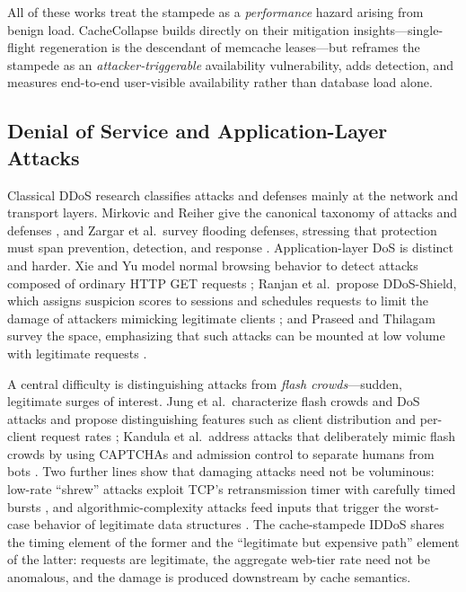 \documentclass[preprint,12pt]{elsarticle}
\begin{document}
All of these works treat the stampede as a \emph{performance} hazard arising from
benign load. CacheCollapse builds directly on their mitigation insights---single-flight
regeneration is the descendant of memcache leases---but reframes the stampede as an
\emph{attacker-triggerable} availability vulnerability, adds detection, and measures
end-to-end user-visible availability rather than database load alone.

\subsection{Denial of Service and Application-Layer Attacks}
Classical DDoS research classifies attacks and defenses mainly at the network and
transport layers. Mirkovic and Reiher give the canonical taxonomy of attacks and
defenses \cite{mirkovic2004}, and Zargar et al.\ survey flooding defenses, stressing
that protection must span prevention, detection, and response \cite{zargar2013}.
Application-layer DoS is distinct and harder. Xie and Yu model normal browsing behavior
to detect attacks composed of ordinary HTTP GET requests \cite{xie2009}; Ranjan et al.\
propose DDoS-Shield, which assigns suspicion scores to sessions and schedules requests
to limit the damage of attackers mimicking legitimate clients \cite{ranjan2009};
and Praseed and Thilagam survey the space, emphasizing that such attacks can be
mounted at low volume with legitimate requests \cite{praseed2019}.

A central difficulty is distinguishing attacks from \emph{flash crowds}---sudden,
legitimate surges of interest. Jung et al.\ characterize flash crowds and DoS attacks
and propose distinguishing features such as client distribution and per-client request
rates \cite{jung2002}; Kandula et al.\ address attacks that deliberately mimic flash
crowds by using CAPTCHAs and admission control to separate humans from bots
\cite{kandula2005}. Two further lines show that damaging attacks need not be
voluminous: low-rate ``shrew'' attacks exploit TCP's retransmission timer with
carefully timed bursts \cite{kuzmanovic2003}, and algorithmic-complexity attacks feed
inputs that trigger the worst-case behavior of legitimate data structures
\cite{crosby2003}. The cache-stampede IDDoS shares the timing element of the former and
the ``legitimate but expensive path'' element of the latter: requests are legitimate,
the aggregate web-tier rate need not be anomalous, and the damage is produced
downstream by cache semantics.
\end{document}
